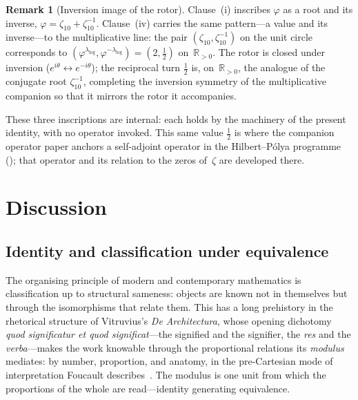 \documentclass[11pt]{amsart}
\theoremstyle{definition}
\newtheorem{Remark}[Theorem]{Remark}
\newcommand{\golden}{\varphi}
\begin{document}
\begin{Remark}[Inversion image of the rotor]\label{rem:inversion-image}
Clause~(i) inscribes $\golden$ as a root and its inverse,
$\golden=\zeta_{10}+\zeta_{10}^{-1}$.  Clause~(iv) carries the same
pattern---a value and its inverse---to the multiplicative line: the pair
$(\zeta_{10},\zeta_{10}^{-1})$ on the unit circle corresponds to
$(\golden^{\lambda_{\log}},\golden^{-\lambda_{\log}})=(2,\tfrac12)$
on~$\mathbb{R}_{>0}$.  The rotor is closed under inversion
($e^{i\theta}\leftrightarrow e^{-i\theta}$); the reciprocal turn
$\tfrac12$ is, on~$\mathbb{R}_{>0}$, the analogue of the conjugate root
$\zeta_{10}^{-1}$, completing the inversion symmetry of the
multiplicative companion so that it mirrors the rotor it accompanies.
\end{Remark}

These three inscriptions are internal: each holds by the machinery of
the present identity, with no operator invoked.  This same value
$\tfrac12$ is where the companion operator paper anchors a self-adjoint
operator in the Hilbert--P\'olya programme ();
that operator and its relation to the zeros of~$\zeta$ are developed
there.

\section{Discussion}
\label{sec:discussion}

\subsection*{Identity and classification under equivalence}
The organising principle of modern and contemporary mathematics is
classification up to structural sameness: objects are known not in
themselves but through the isomorphisms that relate them.  This has a long
prehistory in the rhetorical structure of Vitruvius's \emph{De
Architectura}, whose opening dichotomy \emph{quod significatur et quod
significat}---the signified and the signifier, the \emph{res} and the
\emph{verba}---makes the work knowable through the proportional relations
its \emph{modulus} mediates: by number, proportion, and anatomy, in the
pre-Cartesian mode of interpretation Foucault
describes~\cite{santos-vitruvio,foucault-1966}.  The modulus is one unit
from which the proportions of the whole are read---identity generating
equivalence.
\end{document}
